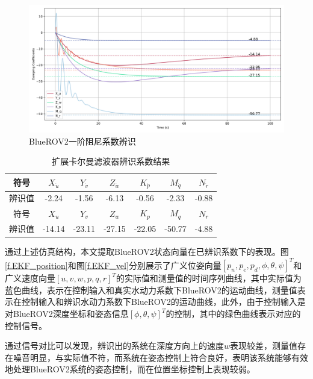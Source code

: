 \begin{figure}[hbt]
    \centering
    \includegraphics[width=0.8\linewidth]{images/chapter3/阻尼系数辨识结果.png}
    \caption{BlueROV2一阶阻尼系数辨识}
    \label{f.damping_ident}
\end{figure}

\begin{table}[htb]
  \centering
  \caption{扩展卡尔曼滤波器辨识系数结果}
  \label{t.ident_results}
  \begin{tabular}{ccccccc}
  \hline
符号 & $X_{\dot{u}}$ & $Y_{\dot{v}}$ & $Z_{\dot{w}}$ & $K_{\dot{p}}$ & $M_{\dot{q}}$ & $N_{\dot{r}}$ \\
\hline
辨识值  & -2.24  & -1.56 & -6.13  & -0.56 & -2.33 & -0.88   \\
\hline
\hline
符号 & $X_u$ & $Y_v$ & $Z_w$ & $K_p$ & $M_q$ & $N_r$ \\
\hline
辨识值  & -14.14 & -23.11  & -27.15 & -22.05  & -50.77 & -4.88 \\
\hline
\end{tabular}
\end{table}

通过上述仿真结构，本文提取BlueROV2状态向量在已辨识系数下的表现。图\ref{f.EKF_position}和图\ref{f.EKF_vel}分别展示了广义位姿向量$[p_n,p_e,p_d,\phi, \theta, \psi]^T$和广义速度向量$[u,v,w,p,q,r]^T$的实际值和测量值的时间序列曲线，其中实际值为蓝色曲线，表示在控制输入和真实水动力系数下BlueROV2的运动曲线，测量值表示在控制输入和辨识水动力系数下BlueROV2的运动曲线，此外，由于控制输入是对BlueROV2深度坐标和姿态信息$[\phi, \theta,\psi]^T$的控制，其中的绿色曲线表示对应的控制信号。

通过信号对比可以发现，辨识出的系统在深度方向上的速度$w$表现较差，测量值存在噪音明显，与实际值不符，而系统在姿态控制上符合良好，表明该系统能够有效地处理BlueROV2系统的姿态控制，而在位置坐标控制上表现较弱。

